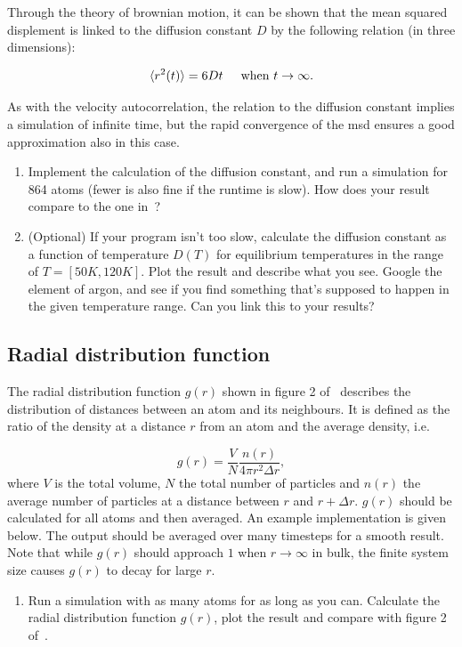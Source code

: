 \documentclass[11pt,english,a4paper]{report}
\begin{document}
Through the theory of brownian motion, it can be shown that the mean
squared displement is linked to the diffusion constant $D$ by the
following relation (in three dimensions):

\begin{equation}
 \langle r^2(t) \rangle = 6Dt \hspace{0.5 cm} \text{when } t \rightarrow \infty.
\end{equation}

As with the velocity autocorrelation, the relation to the diffusion
constant implies a simulation of infinite time, but the rapid
convergence of the msd ensures a good approximation also in this case.

\begin{enumerate}[label=\roman*., resume]
    \item Implement the calculation of the diffusion constant, and run a simulation for 864 atoms (fewer is also fine if the runtime is slow). How does your result compare to the one in~\cite{Rahman_1964}?
    \item (Optional) If your program isn't too slow, calculate the diffusion constant as a function of temperature \(D(T)\) for equilibrium temperatures in the range of \(T = [50 K, 120K]\). Plot the result and describe what you see. Google the element of argon, and see if you find something that's supposed to happen in the given temperature range. Can you link this to your results?   
\end{enumerate}




\subsection{Radial distribution function}

The radial distribution function \(g(r)\) shown in figure 2
of~\cite{Rahman_1964} describes the distribution of distances between
an atom and its neighbours. It is defined as the ratio of the density
at a distance \(r\) from an atom and the average density, i.e.

\begin{equation}
    g(r) = \frac{V}{N} \frac{n(r)}{4\pi r^2\Delta r},\label{eq:rdf}
\end{equation}
where \(V\) is the total volume, \(N\) the total number of particles and \(n(r)\) the average number of particles at a distance between \(r\) and \(r+\Delta r\). \(g(r)\) should be calculated for all atoms and then averaged. An example implementation is given below. The output should be averaged over many timesteps for a smooth result. Note that while \(g(r)\) should approach \(1\) when \(r\to\infty\) in bulk, the finite system size causes \(g(r)\) to decay for large \(r\).
\begin{enumerate}[label=\roman*.]
    \item Run  a simulation with as many atoms for as long as you can. Calculate the radial distribution function \(g(r)\), plot the result and compare with figure 2 of~\cite{Rahman_1964}.
\end{enumerate}

\end{document}

